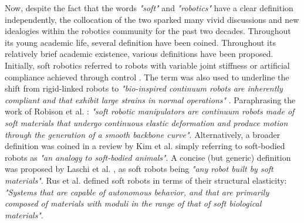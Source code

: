 Now, despite the fact that the words \emph{"soft"} and \emph{"robotics"} have a clear definition independently, the collocation of the two sparked many vivid discussions and new idealogies within the robotics community for the past two decades. Throughout its young academic life, several definition have been coined. Throughout its relatively brief academic existence, various definitions have been proposed. Initially, soft robotics referred to robots with variable joint stiffness \cite{AlbuSchaffer2004} or artificial compliance achieved through control \cite{AlbuSchaffer2011}. The term was also used to underline the shift from rigid-linked robots to \textit{"bio-inspired continuum robots are inherently compliant and that exhibit large strains in normal operations"} \cite{Trivedi2008}. Paraphrasing the work of Robison et al. \cite{Robinson1999}: \textit{"soft robotic manipulators are continuum robots made of soft materials that undergo continuous elastic deformation and produce motion through the generation of a smooth backbone curve"}. Alternatively, a broader definition was coined in a review by Kim et al. \cite{Kim2013} simply referring to soft-bodied robots as \textit{"an analogy to soft-bodied animals"}. A concise (but generic) definition was proposed by Laschi et al. \cite{Laschi2014}, as soft robots being \textit{"any robot built by soft materials"}. Rus et al. \cite{Rus2015} defined soft robots in terms of their structural elasticity: \textit{"Systems that are capable of autonomous behavior, and that are primarily composed of materials with moduli in the range of that of soft biological materials"}.

